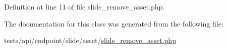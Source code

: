 Definition at line 11 of file slide\+\_\+remove\+\_\+asset.\+php.



The documentation for this class was generated from the following file\+:\begin{DoxyCompactItemize}
\item 
tests/api/endpoint/slide/asset/\hyperlink{tests_2api_2endpoint_2slide_2asset_2slide__remove__asset_8php}{slide\+\_\+remove\+\_\+asset.\+php}\end{DoxyCompactItemize}
